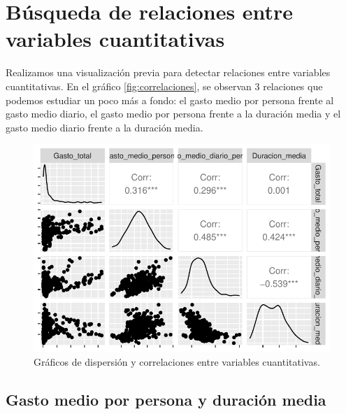 \documentclass[data,article,submit,moreauthors,pdftex]{Definitions/mdpi}
\begin{document}
\section{Búsqueda de relaciones entre variables
cuantitativas}\label{buxfasqueda-de-relaciones-entre-variables-cuantitativas}

Realizamos una visualización previa para detectar relaciones entre
variables cuantitativas. En el gráfico \ref{fig:correlaciones}, se
observan 3 relaciones que podemos estudiar un poco más a fondo: el gasto
medio por persona frente al gasto medio diario, el gasto medio por
persona frente a la duración media y el gasto medio diario frente a la
duración media.

\begin{figure}[H]
\includegraphics{ProyectoAED2024_Rmd_files/figure-latex/unnamed-chunk-39-1} \caption{Gráficos de dispersión y correlaciones entre variables cuantitativas.\label{fig:correlaciones}}\label{fig:unnamed-chunk-39}
\end{figure}

\subsection{Gasto medio por persona y duración
media}\label{gasto-medio-por-persona-y-duraciuxf3n-media}
\end{document}
